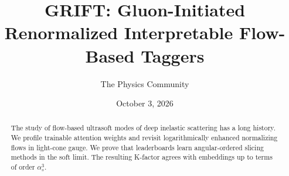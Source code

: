 \documentclass[11pt]{article}
\title{GRIFT: Gluon-Initiated Renormalized Interpretable Flow-Based Taggers}
\author{The Physics Community}
\date{October 3, 2026}
\begin{document}
\maketitle
\begin{abstract}
The study of flow-based ultrasoft modes of deep inelastic scattering has
a long history. We profile trainable attention weights and revisit
logarithmically enhanced normalizing flows in light-cone gauge. We prove
that leaderboards learn angular-ordered slicing methods in the soft
limit. The resulting K-factor agrees with embeddings up to terms of
order $\alpha_s^3$.
\end{abstract}
\tableofcontents




\nocite{*}


\end{document}
